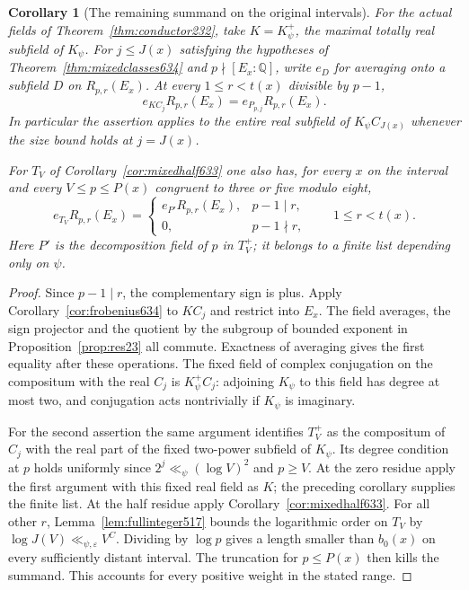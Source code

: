 \documentclass[a4paper,11pt]{article}
\newtheorem{corollary}[proposition]{Corollary}
\theoremstyle{definition}
\theoremstyle{remark}
\numberwithin{equation}{section}
\begin{document}
\begin{corollary}[The remaining summand on the original intervals]
\leavevmode\label{cor:intervalzero634}
For the actual fields of Theorem~\ref{thm:conductor232}, take
\(K=K_\psi^+\), the maximal totally real subfield of \(K_\psi\).
For \(j\le J(x)\) satisfying the hypotheses of
Theorem~\ref{thm:mixedclasses634} and \(p\nmid[E_x:\mathbb Q]\),
write \(e_D\) for averaging onto a subfield \(D\) on \(R_{p,r}(E_x)\).
At every \(1\le r<t(x)\) divisible by \(p-1\),
\[
                  e_{K C_j} R_{p,r}(E_x)
                     =e_{P_{p,j}}R_{p,r}(E_x).
\]
In particular the assertion applies to the entire real subfield
of \(K_\psi C_{J(x)}\) whenever the size bound holds at \(j=J(x)\).

For \(T_V\) of Corollary~\ref{cor:mixedhalf633} one also has, for
every \(x\) on the interval and every \(V\le p\le P(x)\) congruent to
three or five modulo eight,
\[
      e_{T_V}R_{p,r}(E_x)=
      \begin{cases}
        e_{P'}R_{p,r}(E_x),&p-1\mid r,\\
        0,&p-1\nmid r ,
      \end{cases}\qquad 1\le r<t(x).
\]
Here \(P'\) is the decomposition field of \(p\) in \(T_V^+\);
it belongs to a finite list depending only on \(\psi\).
\end{corollary}
\begin{proof}
Since \(p-1\mid r\), the complementary sign is plus. Apply
Corollary~\ref{cor:frobenius634} to \(K C_j\) and restrict into
\(E_x\). The field averages, the sign projector and the quotient by
the subgroup of bounded exponent in Proposition~\ref{prop:res23}
all commute. Exactness of averaging gives the first equality after
these operations. The fixed field of complex conjugation on the
compositum with the real \(C_j\) is \(K_\psi^+ C_j\): adjoining
\(K_\psi\) to this field has degree at most two, and conjugation acts
nontrivially if \(K_\psi\) is imaginary.

For the second assertion the same argument identifies \(T_V^+\)
as the compositum of \(C_j\) with the real part of the fixed
two-power subfield of \(K_\psi\). Its degree condition at \(p\)
holds uniformly since \(2^j\ll_\psi(\log V)^2\) and \(p\ge V\).
At the zero residue apply the first argument with this fixed real
field as \(K\); the preceding corollary supplies the finite list.
At the half residue apply Corollary~\ref{cor:mixedhalf633}.
For all other \(r\), Lemma~\ref{lem:fullinteger517} bounds the
logarithmic order on \(T_V\) by \(\log J(V)\ll_{\psi,\varepsilon}V^C\).
Dividing by \(\log p\) gives a length smaller than \(b_0(x)\) on
every sufficiently distant interval. The truncation for \(p\le P(x)\)
then kills the summand. This accounts for every positive weight
in the stated range.
\end{proof}
\end{document}
